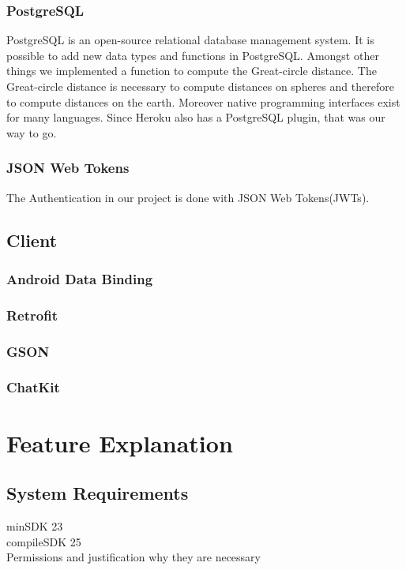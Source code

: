 \documentclass[11pt, accentcolor=tud1c]{tudreport}
\begin{document}
\subsection{PostgreSQL}
PostgreSQL\cite{postgresql} is an open-source relational database management system. It is possible to add new data types and functions in PostgreSQL. Amongst other things we implemented a function to compute the Great-circle distance\cite{greatcircledist}. The Great-circle distance is necessary to compute distances on spheres and therefore to compute distances on the earth. Moreover native programming interfaces exist for many languages. Since Heroku also has a PostgreSQL plugin, that was our way to go.
\subsection{JSON Web Tokens}\label{sec:json_web_tokens}
The Authentication in our project is done with JSON Web Tokens(JWTs)\cite{jwt}.

\section{Client}\label{sec:client}
\subsection{Android Data Binding}
\cite{databinding}
\subsection{Retrofit}
\cite{retrofit}
\subsection{GSON}
\cite{gson}
\subsection{ChatKit}
\cite{chatkit}



\chapter{Feature Explanation}\label{ch:feature_explanation}


\section{System Requirements}
minSDK 23 \\
compileSDK 25 \\
Permissions and justification why they are necessary
\end{document}

